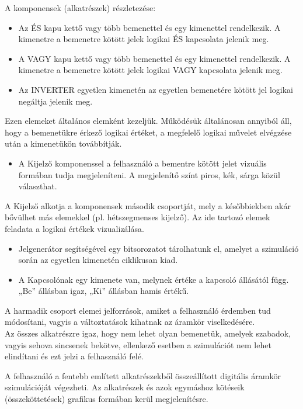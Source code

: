 \noindent A komponensek (alkatrészek) részletezése:

\begin{itemize}
\item Az ÉS kapu kettő vagy több bemenettel és egy kimenettel rendelkezik. A kimenetre a bemenetre kötött jelek logikai ÉS kapcsolata jelenik meg. 
\item A VAGY kapu kettő vagy több bemenettel és egy kimenettel rendelkezik. A kimenetre a bemenetre kötött jelek logikai VAGY kapcsolata jelenik meg.
\item Az INVERTER egyetlen kimenetén az egyetlen bemenetére kötött jel logikai negáltja jelenik meg.
\end{itemize}

Ezen elemeket általános elemként kezeljük. Működésük általánosan annyiból áll, hogy a bemenetükre érkező logikai értéket, a megfelelő logikai művelet elvégzése után a kimenetükön továbbítják.

\begin{itemize}
\item A Kijelző komponenssel a felhasználó a bementre kötött jelet vizuális formában tudja megjeleníteni. A megjelenítő színt piros, kék, sárga közül választhat.
\end{itemize}
	
A Kijelző alkotja a komponensek második csoportját, mely a későbbiekben akár bővülhet más elemekkel (pl. hétszegmenses kijelző). Az ide tartozó elemek feladata a logikai értékek vizualizálása.

\begin{itemize}
\item Jelgenerátor segítségével egy bitsorozatot tárolhatunk el, amelyet a szimuláció során az egyetlen kimenetén ciklikusan kiad.
\item A Kapcsolónak egy kimenete van, melynek értéke a kapcsoló állásától függ. „Be” állásban igaz, „Ki” állásban hamis értékű.
\end{itemize}

A harmadik csoport elemei jelforrások, amiket a felhasználó érdemben tud módosítani, vagyis a változtatások kihatnak az áramkör viselkedésére.\\

Az összes alkatrészre igaz, hogy nem lehet olyan bemenetük, amelyek szabadok, vagyis sehova sincsenek bekötve, ellenkező esetben a szimulációt nem lehet elindítani és ezt jelzi a felhasználó felé.

A felhasználó a fentebb említett alkatrészekből összeállított digitális áramkör szimulációját végezheti. Az alkatrészek és azok egymáshoz kötéseik (összeköttetések) grafikus formában kerül megjelenítésre.

